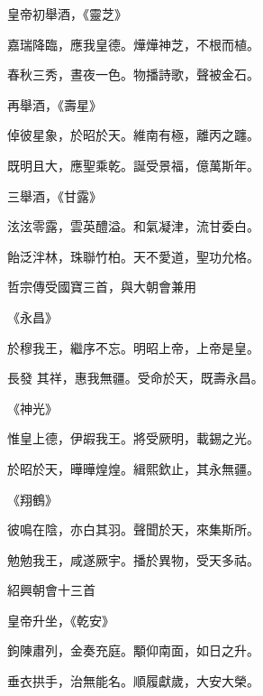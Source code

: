 \begin{pinyinscope}
 皇帝初舉酒，《靈芝》



 嘉瑞降臨，應我皇德。燁燁神芝，不根而植。



 春秋三秀，晝夜一色。物播詩歌，聲被金石。



 再舉酒，《壽星》



 倬彼星象，於昭於天。維南有極，離丙之躔。



 既明且大，應聖乘乾。誕受景福，億萬斯年。



 三舉酒，《甘露》



 泫泫零露，雲英醴溢。和氣凝津，流甘委白。



 飴泛泮林，珠聯竹柏。天不愛道，聖功允格。



 哲宗傳受國寶三首，與大朝會兼用



 《永昌》



 於穆我王，繼序不忘。明昭上帝，上帝是皇。



 長發
 其祥，惠我無疆。受命於天，既壽永昌。



 《神光》



 惟皇上德，伊嘏我王。將受厥明，載錫之光。



 於昭於天，曄曄煌煌。緝熙欽止，其永無疆。



 《翔鶴》



 彼鳴在陰，亦白其羽。聲聞於天，來集斯所。



 勉勉我王，咸遂厥宇。播於異物，受天多祜。



 紹興朝會十三首



 皇帝升坐，《乾安》



 鉤陳肅列，金奏充庭。顒仰南面，如日之升。



 垂衣拱手，治無能名。順履獻歲，大安大榮。




\end{pinyinscope}
